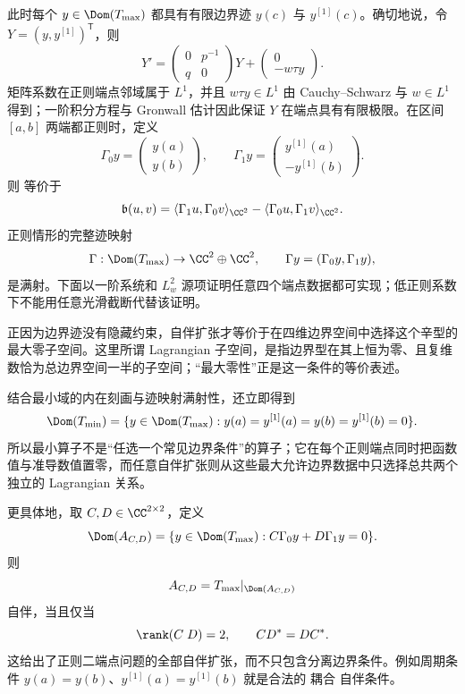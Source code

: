 \begin{proposition}[正则端点的迹空间与最小域]
此时每个 $y\in\Dom(T_{\max})$ 都具有有限边界迹 $y(c)$ 与 $y^{[1]}(c)$。确切地说，令 $Y=(y,y^{[1]})^{\mathsf T}$，则
\[
 Y'=
 \begin{pmatrix}0&p^{-1}\\ q&0\end{pmatrix}Y
 +\begin{pmatrix}0\\-w\tau y\end{pmatrix}.
\]
矩阵系数在正则端点邻域属于 $L^1$，并且 $w\tau y\in L^1$ 由 Cauchy--Schwarz 与 $w\in L^1$ 得到；一阶积分方程与 Gronwall 估计因此保证 $Y$ 在端点具有有限极限。在区间 $[a,b]$ 两端都正则时，定义
\[
 \Gamma_0y=
 \begin{pmatrix}y(a)\\y(b)\end{pmatrix},
 \qquad
 \Gamma_1y=
 \begin{pmatrix}y^{[1]}(a)\\-y^{[1]}(b)\end{pmatrix}.
\]
则 等价于
\[
 \mathfrak b(u,v)
 =\langle\Gamma_1u,\Gamma_0v\rangle_{\CC^2}
 -\langle\Gamma_0u,\Gamma_1v\rangle_{\CC^2}.
\]
正则情形的完整迹映射
\[
 \Gamma:\Dom(T_{\max})\to\CC^2\oplus\CC^2,
 \qquad
 \Gamma y=(\Gamma_0y,\Gamma_1y),
\]
是满射。下面以一阶系统和 $L^2_w$ 源项证明任意四个端点数据都可实现；低正则系数下不能用任意光滑截断代替该证明。

正因为边界迹没有隐藏约束，自伴扩张才等价于在四维边界空间中选择这个辛型的最大零子空间。这里所谓 Lagrangian 子空间，是指边界型在其上恒为零、且复维数恰为总边界空间一半的子空间；“最大零性”正是这一条件的等价表述。

结合最小域的内在刻画与迹映射满射性，还立即得到
\begin{equation*}\Dom(T_{\min})
 =\{y\in\Dom(T_{\max}):
 y(a)=y^{[1]}(a)=y(b)=y^{[1]}(b)=0\}.
\end{equation*}
所以最小算子不是“任选一个常见边界条件”的算子；它在每个正则端点同时把函数值与准导数值置零，而任意自伴扩张则从这些最大允许边界数据中只选择总共两个独立的 Lagrangian 关系。
\end{proposition}

\begin{theorem}[正则二端点问题的全部自伴边界条件]
更具体地，取 $C,D\in\CC^{2\times2}$，定义
\[
 \Dom(A_{C,D})
 =\{y\in\Dom(T_{\max}):C\Gamma_0y+D\Gamma_1y=0\}.
\]
则
\[
 A_{C,D}=T_{\max}|_{\Dom(A_{C,D})}
\]
自伴，当且仅当
\[
 \rank(C\;D)=2,
 \qquad CD^*=DC^*.
\]
这给出了正则二端点问题的全部自伴扩张，而不只包含分离边界条件。例如周期条件 $y(a)=y(b)$、$y^{[1]}(a)=y^{[1]}(b)$ 就是合法的 耦合 自伴条件。
\end{theorem}

